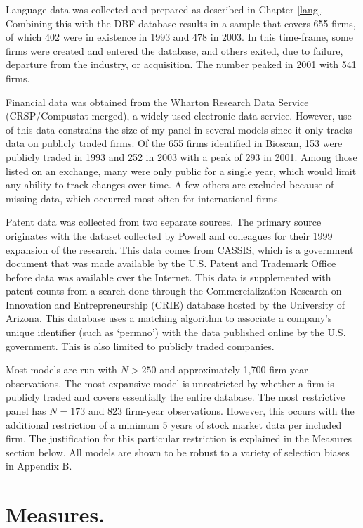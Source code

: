 Language data was collected and prepared as described in Chapter \ref{lang}. Combining this with the DBF database results in a sample that covers 655 firms, of which 402 were in existence in 1993 and 478 in 2003. In this time-frame, some firms were created and entered the database, and others exited, due to failure, departure from the industry, or acquisition. The number peaked in 2001 with 541 firms.

Financial data was obtained from the Wharton Research Data Service (CRSP/Compustat merged), a widely used electronic data service. However, use of this data constrains the size of my panel in several models since it only tracks data on publicly traded firms. Of the 655 firms identified in Bioscan, 153 were publicly traded in 1993 and 252 in 2003 with a peak of 293 in 2001. Among those listed on an exchange, many were only public for a single year, which would limit any ability to track changes over time. A few others are excluded because of missing data, which occurred most often for international firms. 

Patent data was collected from two separate sources. The primary source originates with the dataset collected by Powell and colleagues for their 1999 expansion of the \citet{powell1996} research. This data comes from CASSIS, which is a government document that was made available by the U.S. Patent and Trademark Office before data was available over the Internet. This data is supplemented with patent counts from a search done through the Commercialization Research on Innovation and Entrepreneurship (CRIE) database hosted by the University of Arizona. This database uses a matching algorithm to associate a company's unique identifier (such as `permno') with the data published online by the U.S. government. This is also limited to publicly traded companies.

Most models are run with $N>250$ and approximately 1,700 firm-year observations. The most expansive model is unrestricted by whether a firm is publicly traded and covers essentially the entire database. The most restrictive panel has $N=173$ and 823 firm-year observations. However, this occurs with the additional restriction of a minimum 5 years of stock market data per included firm. The justification for this particular restriction is explained in the Measures section below. All models are shown to be robust to a variety of selection biases in Appendix B.

\section{Measures.}

